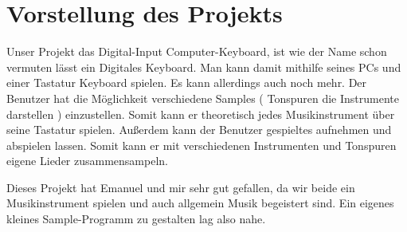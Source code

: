 \section{Vorstellung des Projekts}


Unser Projekt das Digital-Input Computer-Keyboard, ist wie der Name schon vermuten lässt ein Digitales Keyboard. Man kann damit mithilfe seines PCs und einer Tastatur Keyboard spielen. Es kann allerdings auch noch mehr. Der Benutzer hat die Möglichkeit verschiedene Samples ( Tonspuren die Instrumente darstellen ) einzustellen. Somit kann er theoretisch jedes Musikinstrument über seine Tastatur spielen. Außerdem kann der Benutzer gespieltes aufnehmen und abspielen lassen. Somit kann er mit verschiedenen Instrumenten und Tonspuren eigene Lieder zusammensampeln. 

Dieses Projekt hat Emanuel und mir sehr gut gefallen, da wir beide ein Musikinstrument spielen und auch allgemein Musik begeistert sind. Ein eigenes kleines Sample-Programm zu gestalten lag also nahe.  

